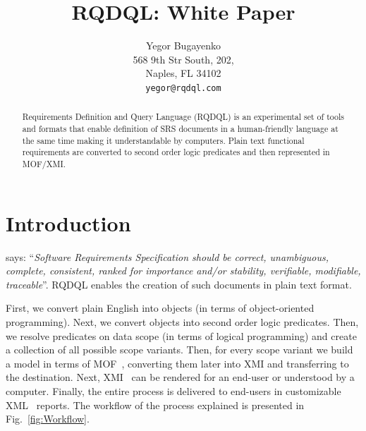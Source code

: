 \documentclass[12pt,oneside,letterpaper]{article}
\begin{document}
    \setlength{\parindent}{0pt}
    \setlength{\parskip}{1em}
    \newcommand{\type}[1]{\mbox{\texttt{#1}}}
    \newenvironment{maths}
    {
        \vspace*{0.5em}
        \begin{tabular}{l>{\raggedright\arraybackslash}p{20em}}
    }
    {
        \end{tabular}
        \vspace*{1em}
    }



\title{RQDQL: White Paper}
    \author{
        Yegor Bugayenko\\
        568 9th Str South, 202, \\
        Naples, FL 34102\\
        \texttt{yegor@rqdql.com}
    }
    \maketitle
    \begin{abstract}
        Requirements Definition and Query Language (RQDQL) is
        an experimental set of tools and formats that enable definition of
        SRS documents in a
        human-friendly language at the same time making it understandable
        by computers. Plain text functional requirements are converted to
        second order logic predicates and then represented in MOF/XMI.
    \end{abstract}




\section{Introduction}

    \citet{ieee830} says: ``\emph{Software Requirements Specification should be
    correct, unambiguous, complete, consistent, ranked for importance and/or stability,
    verifiable, modifiable, traceable}''. RQDQL enables the creation
    of such documents in plain text format.

    First, we convert plain English into objects (in terms of object-oriented
    programming). Next, we convert objects into second order logic predicates.
    Then, we resolve predicates on data scope (in terms of logical programming)
    and create a collection of all possible scope variants. Then, for every
    scope variant we build a model in terms of MOF~\citet{mof2}, converting them later
    into XMI and transferring to the destination. Next, XMI~\citet{mof-to-xmi} can be rendered
    for an end-user or understood by a computer. Finally, the entire process
    is delivered to end-users in customizable XML~\citet{xml} reports.
    The workflow of the process explained is presented in Fig.~\ref{fig:Workflow}.
\end{document}
